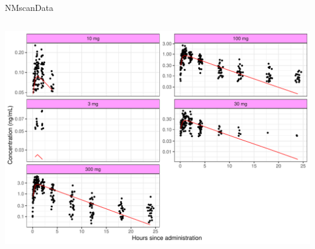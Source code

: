 \documentclass[
  8pt,
  ignorenonframetext,
  aspectratio=169]{beamer}
\begin{document}
\begin{frame}[fragile]{NMscanData}
\begin{columns}[T]
\begin{column}{0.55\textwidth}
\begin{center}\includegraphics[width=1.05\linewidth]{plots/aplot-1} \end{center}
\end{column}
\end{columns}
\end{frame}
\end{document}
